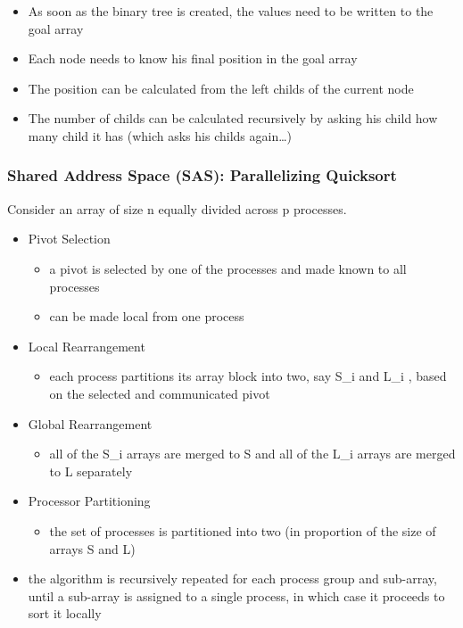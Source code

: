 \begin{itemize}
\tightlist
\item
  As soon as the binary tree is created, the values need to be written
  to the goal array
\item
  Each node needs to know his final position in the goal array
\item
  The position can be calculated from the left childs of the current
  node
\item
  The number of childs can be calculated recursively by asking his child
  how many child it has (which asks his childs again\ldots{})
\end{itemize}

\clearpage
\hypertarget{shared-address-space-sas-parallelizing-quicksort}{%
\subsubsection{Shared Address Space (SAS): Parallelizing
Quicksort}\label{shared-address-space-sas-parallelizing-quicksort}}

Consider an array of size n equally divided across p processes.

\begin{itemize}
\tightlist
\item
  Pivot Selection

  \begin{itemize}
  \tightlist
  \item
    a pivot is selected by one of the processes and made known to all
    processes
  \item
    can be made local from one process
  \end{itemize}
\item
  Local Rearrangement

  \begin{itemize}
  \tightlist
  \item
    each process partitions its array block into two, say S\_i and L\_i
    , based on the selected and communicated pivot
  \end{itemize}
\item
  Global Rearrangement

  \begin{itemize}
  \tightlist
  \item
    all of the S\_i arrays are merged to S and all of the L\_i arrays
    are merged to L separately
  \end{itemize}
\item
  Processor Partitioning

  \begin{itemize}
  \tightlist
  \item
    the set of processes is partitioned into two (in proportion of the
    size of arrays S and L)
  \end{itemize}
\item
  the algorithm is recursively repeated for each process group and
  sub-array, until a sub-array is assigned to a single process, in which
  case it proceeds to sort it locally
\end{itemize}

